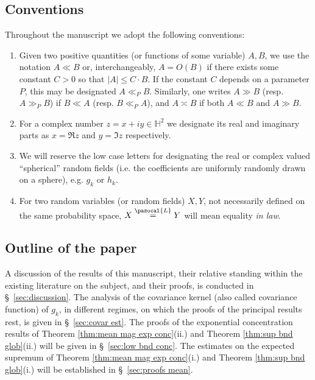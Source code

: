 \documentclass[12pt, a4paper]{amsart}
\theoremstyle{definition}
\newcommand {\1} {\mathbf{1}}
\newcommand {\Lc} {\pazocal {L}}
\newcommand {\Hb} {\mathbb {H}}
\numberwithin{equation}{section}
\begin{document}
\subsection{Conventions}

Throughout the manuscript we adopt the following conventions:

\begin{enumerate}[$\bullet$]

\item Given two positive quantities (or functions of some variable) $A,B$, we use the notation $A\ll B$ or, interchangeably, $A=O(B)$ if there exists some constant $C>0$ so that $|A|\le C\cdot B$.
If the constant $C$ depends on a parameter $P$, this may be designated $A\ll_{P} B$. Similarly, one writes $A\gg B$ (resp. $A\gg_{P} B$) if $B\ll A$ (resp. $B\ll_{P} A$), and $A\asymp B$ if both $A\ll B$ and $A\gg B$.

\vspace{2mm}

\item For a complex number $z=x+iy\in\Hb^{2}$ we designate its real and imaginary parts as $x=\Re{z}$ and $y=\Im{z}$ respectively.

\vspace{2mm}


\item We will reserve the low case letters for designating the real or complex valued
``spherical'' random fields (i.e. the coefficients are uniformly randomly drawn on a sphere), e.g. $g_{k}$ or $h_{k}$.

\vspace{2mm}

\item For two random variables (or random fields) $X,Y$, not necessarily defined on the same probability space, $X \stackrel{\Lc}{=} Y$ will mean equality {\em in law}.


\end{enumerate}




\subsection{Outline of the paper}

A discussion of the results of this manuscript, their relative standing within the existing literature on the subject, and their proofs, is conducted in \S~\ref{sec:discussion}.
The analysis of the covariance kernel (also called covariance function) of $g_{k}$, in different regimes,
on which the proofs of the principal results rest, is given in \S~\ref{sec:covar est}. The proofs of the exponential concentration results of Theorem \ref{thm:mean mag exp conc}(ii.) and Theorem \ref{thm:sup bnd glob}(ii.) 
will be given in \S~\ref{sec:low bnd conc}. The estimates on the expected supremum of Theorem \ref{thm:mean mag exp conc}(i.) and Theorem \ref{thm:sup bnd glob}(i.) will be established in \S~\ref{sec:proofs mean}.
\end{document}
